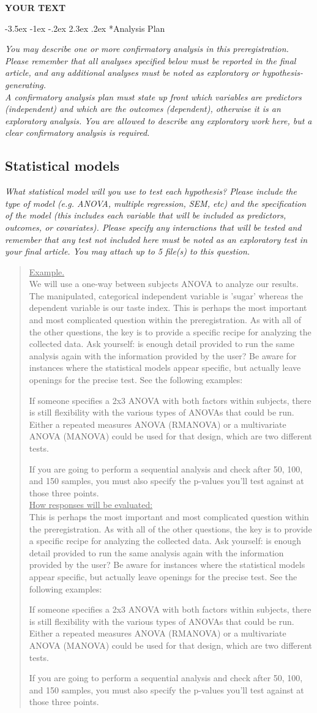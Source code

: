 \documentclass{article}
\makeatletter
\newcommand{\example}[2]{\vspace{-0.3cm}\begin{quote}\underline{Example.}\\#1\ifx#2\undefined \else \\[0.2cm]\underline{How responses will be evaluated:}\\#2\fi\\\end{quote}}
\newcommand{\yourtext}[1]{\noindent\textbf{\color{red}YOUR TEXT}}
\renewcommand{\section}{\@startsection {section}{1}{\z@}%
	{-3.5ex \@plus -1ex \@minus -.2ex}%
	{2.3ex \@plus .2ex}%
	{\normalfont\LARGE\bfseries}}
\makeatother
\begin{document}
	\yourtext

\newpage

\section*{Analysis Plan}

	\ifx\hidehints\undefined
	\textit{You may describe one or more confirmatory analysis in this preregistration. Please remember that all analyses specified below must be reported in the final article, and any additional analyses must be noted as exploratory or hypothesis-generating.\\		
	A confirmatory analysis plan must state up front which variables are predictors (independent) and which are the outcomes (dependent), otherwise it is an exploratory analysis. You are allowed to describe any exploratory work here, but a clear confirmatory analysis is required.}
	\fi
	
	\subsection*{Statistical models}
	
	\ifx\hidehints\undefined
	
	\textit{%
		What statistical model will you use to test each hypothesis? Please include the type of model (e.g. ANOVA, multiple regression, SEM, etc) and the specification of the model (this includes each variable that will be included as predictors, outcomes, or covariates). Please specify any interactions that will be tested and remember that any test not included here must be noted as an exploratory test in your final article. You may attach up to 5 file(s) to this question.
	}\\
	
	\example{
		We will use a one-way between subjects ANOVA to analyze our results. The manipulated, categorical independent variable is 'sugar' whereas the dependent variable is our taste index. 
		}{This is perhaps the most important and most complicated question within the preregistration. As with all of the other questions, the key is to provide a specific recipe for analyzing the collected data. Ask yourself: is enough detail provided to run the same analysis again with the information provided by the user? Be aware for instances where the statistical models appear specific, but actually leave openings for the precise test. See the following examples:
		
		If someone specifies a 2x3 ANOVA with both factors within subjects, there is still flexibility with the various types of ANOVAs that could be run. Either a repeated measures ANOVA (RMANOVA) or a multivariate ANOVA (MANOVA) could be used for that design, which are two different tests.
		
		If you are going to perform a sequential analysis and check after 50, 100, and 150 samples, you must also specify the p-values you’ll test against at those three points.
		}
	
\end{document}

